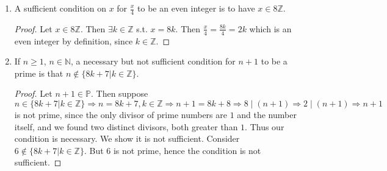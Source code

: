 \documentclass[10pt]{article}
\theoremstyle{plain}
\theoremstyle{definition}
\begin{document}
\begin{enumerate}
\begin{enumerate}

\item $\mathbb{N} \cap \mathbb{R}) = \mathbb{N}$. 
\begin{proof}
Note $\mathbb{N} \subset \mathbb{R}$. 
\end{proof}

\item $(\mathbb{R} - \mathbb{Q}) = \{x \in \mathbb{R}| x\text{ is irrational}\}$. 

\begin{proof}
Note $\mathbb{Q} \subset \mathbb{R}$, and that $\mathbb{Q}$ is defined as the set of all rationals. 

\end{proof}

\item $(\mathbb{Z}^- \cup \mathbb{N}) = \mathbb{Z}$. 

\begin{proof}
Note $\mathbb{Z}^- = \{x \in \mathbb{Z}| x \leq -1\}$, and $\mathbb{N} = \{x \in \mathbb{Z}| x \geq 0\}$. Observe there are no integers in the interval $-1 < x < 0$. 
\end{proof}

\item $(\mathbb{Z} \cup \mathbb{N}) = \mathbb{Z}$. 

\begin{proof}
Observe $\mathbb{N} \subset \mathbb{Z}$. 
\end{proof}

\end{enumerate}

\item A sufficient condition on $x$ for $\frac{x}{4}$ to be an even integer is to have $x \in 8\mathbb{Z}$. 
\begin{proof}
Let $x \in 8\mathbb{Z}$. Then $\exists k \in \mathbb{Z}$ s.t. $x = 8k$. Then $\frac{x}{4} = \frac{8k}{4} = 2k$ which is an even integer by definition, since $ k \in \mathbb{Z}$. 
\end{proof}

\item  If $n \geq 1$, $n \in \mathbb{N}$, a necessary but not sufficient condition for $n + 1$ to be a prime is that $n \notin \{8k + 7| k \in \mathbb{Z}\}$. 

\begin{proof}
Let $n + 1 \in \mathbb{P}$. Then suppose $n \in \{8k + 7| k \in \mathbb{Z}\} \Rightarrow n = 8k + 7, k \in \mathbb{Z} \Rightarrow n + 1 = 8k + 8 \Rightarrow 8 \mid (n + 1) \Rightarrow 2 \mid (n  +1) \Rightarrow n + 1$ is not prime, since the only divisor of prime numbers are $1$ and the number itself, and we found two distinct divisors, both greater than $1$. Thus our condition is necessary. We show it is not sufficient. Consider $6 \notin \{8k + 7| k \in \mathbb{Z}\}$. But $6$ is not prime, hence the condition is not sufficient. 
\end{proof}

\end{enumerate}
\end{document}
